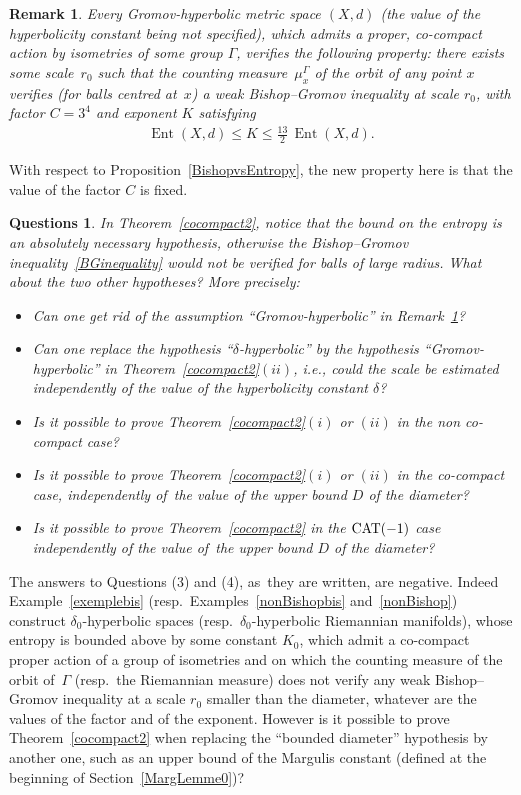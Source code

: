 \documentclass[10pt,a4paper]{amsart}
\numberwithin{equation}{section}
\newtheorem{Remark}[theor]{Remark}
\newtheorem{questions}[theor]{Questions}
\newcommand{\Ent}{\operatorname{Ent}}
\begin{document}
\begin{Remark}\label{BGequivEnt}
Every Gromov-hyperbolic metric space $(X,d)$ (the value of the hyperbolicity constant being not specified), which admits a proper, co-compact action by
isometries of some group $\Gamma$, verifies the following property: there
exists some scale~$r_0 $ such that the counting measure~$ \mu^\Gamma_x $ of
the orbit of any point $x$ verifies (for balls centred at~$x$) a weak Bishop--Gromov inequality at scale $r_0$, with factor $C = 3^{4}$ and exponent $K$ satisfying
\begin{gather*}%
\Ent (X,d) \le K \le \frac{13}{2} \, \Ent (X,d).
\end{gather*}
\end{Remark}

With respect to Proposition~\ref{BishopvsEntropy}, the new property here is that the value of the factor $C$ is fixed.

\begin{questions} In Theorem~\ref{cocompact2}, notice that the bound on the entropy is an absolutely necessary hypothesis, otherwise the Bishop--Gromov
inequality~\eqref{BGinequality} would not be verified for balls of large radius. What about the two other hypotheses? More precisely:
\begin{itemize}\itemsep=0pt
\item[(1)]
Can one get rid of the assumption ``Gromov-hyperbolic'' in Remark~\ref{BGequivEnt}?
\item[(2)]
Can one replace the hypothesis ``$\delta$-hyperbolic'' by
the hypothesis ``Gromov-hyperbolic'' in Theorem~\ref{cocompact2}$(ii)$, i.e., could the scale be estimated independently of
the value of the hyperbolicity constant $\delta$?
\item[(3)]
Is it possible to prove Theorem~\ref{cocompact2}$(i)$ or $(ii)$ in the non co-compact case?
\item[(4)]
Is it possible to prove Theorem~\ref{cocompact2}$(i)$ or $(ii)$ in the co-compact case, independently of~the value
of the upper bound $D$ of the diameter?
\item[(5)]
Is it possible to prove Theorem~\ref{cocompact2} in the ${\rm CAT}(-1)$ case independently of the value of~the upper bound $D$ of the diameter?
\end{itemize}
\end{questions}

The answers to Questions (3) and (4), as~they are written, are negative. Indeed Example~\ref{exemplebis} (resp.\ Examples~\ref{nonBishopbis} and~\ref{nonBishop}) construct $\delta_0$-hyperbolic spaces (resp.\ $\delta_0$-hyperbolic Riemannian manifolds), whose entropy is bounded above by some
constant $K_0$, which admit a co-compact proper action of a group of isometries and on which the counting measure of the orbit of~$\Gamma$ (resp.\ the Riemannian measure) does not verify any weak Bishop--Gromov inequality
at a scale $r_0 $ smaller than the diameter, whatever are the values of the factor
and of the exponent.
However is it possible to prove Theorem~\ref{cocompact2} when replacing the ``bounded diameter'' hypothesis by another one, such as an upper bound
of the Margulis constant (defined at the beginning of Section~\ref{MargLemme0})?
\end{document}
